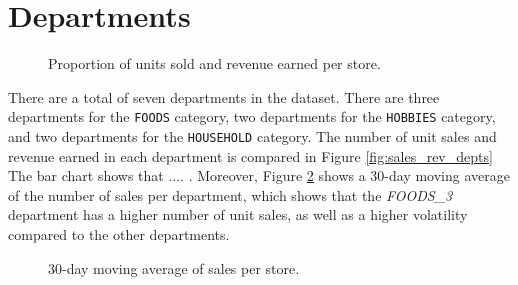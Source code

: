 \section{Departments}
\begin{figure}
    \vspace{-10pt}
    \centering
    \captionsetup{width=0.52\textwidth}
    \caption{Proportion of units sold and revenue earned per store.}
    \label{fig:depts_rev_stores}
    \vspace{-10pt}
\end{figure}
There are a total of seven departments in the dataset. 
There are three departments for the \texttt{FOODS} category, two departments for the \texttt{HOBBIES} category, and two departments for the \texttt{HOUSEHOLD} category.
The number of unit sales and revenue earned in each department is compared in Figure \ref{fig:sales_rev_depts}
The bar chart shows that .... .
Moreover, Figure \ref{fig:dept_sales} shows a 30-day moving average of the number of sales per department, which shows that the \textit{FOODS\_3} department has a higher number of unit sales, as well as a higher volatility compared to the other departments.

\begin{figure}[H]
    \centering
    \caption{30-day moving average of sales per store.}
    \label{fig:dept_sales}
\end{figure}
